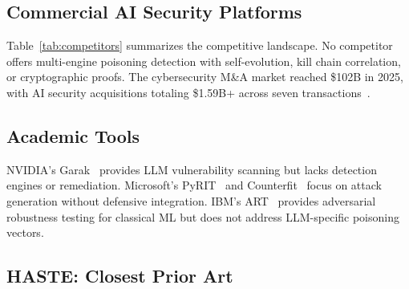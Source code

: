 \documentclass[11pt,twocolumn]{article}
\begin{document}
\subsection{Commercial AI Security Platforms}

\begin{table}[t]
\centering
\caption{Competitive landscape comparison. Funding/acquisition values in USD.}
\label{tab:competitors}
\end{table}

Table~\ref{tab:competitors} summarizes the competitive landscape. No competitor offers multi-engine poisoning detection with self-evolution, kill chain correlation, or cryptographic proofs. The cybersecurity M\&A market reached \$102B in 2025, with AI security acquisitions totaling \$1.59B+ across seven transactions~\cite{softwarestrategies}.

\subsection{Academic Tools}

NVIDIA's Garak~\cite{garak} provides LLM vulnerability scanning but lacks detection engines or remediation. Microsoft's PyRIT~\cite{pyrit} and Counterfit~\cite{counterfit} focus on attack generation without defensive integration. IBM's ART~\cite{art} provides adversarial robustness testing for classical ML but does not address LLM-specific poisoning vectors.

\subsection{HASTE: Closest Prior Art}
\end{document}
